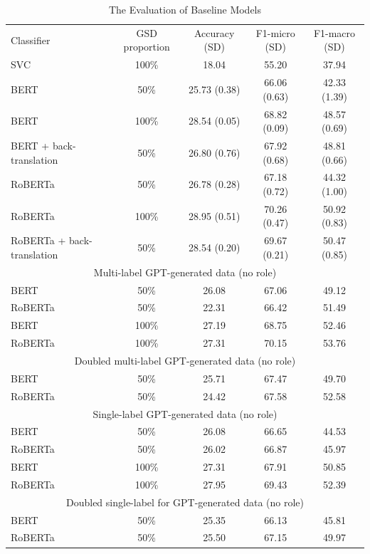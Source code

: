 \documentclass[manuscript]{clv3}
\begin{document}
\begin{table}
    \centering
    \begin{tabular}{lcccc}
          Classifier&GSD proportion&  Accuracy (SD)&  F1-micro (SD)&  F1-macro (SD)\\
         SVC&100\%&  18.04&  55.20&  37.94 \\
         BERT&50\%&  25.73 (0.38)&  66.06 (0.63)&  42.33 (1.39)\\
         BERT&100\%&  28.54 (0.05)&  68.82 (0.09)&  48.57 (0.69)\\
 BERT + back-translation&50\%& 26.80 (0.76)& 67.92 (0.68)& 48.81 (0.66)\\
 RoBERTa&50\%& 26.78 (0.28)& 67.18 (0.72)& 44.32 (1.00)\\
 RoBERTa&100\%& 28.95 (0.51)& 70.26 (0.47)& 50.92 (0.83)\\
 RoBERTa + back-translation&50\%& 28.54 (0.20)& 69.67 (0.21)& 50.47 (0.85)\\
 \multicolumn{5}{c}{Multi-label GPT-generated data (no role)}\\
 BERT&50\%& 26.08& 67.06& 49.12 \\
 RoBERTa&50\%& 22.31& 66.42& 51.49 \\
 BERT& 100\%& 27.19& 68.75& 52.46\\
 RoBERTa& 100\%& 27.31& 70.15& 53.76\\
 \multicolumn{5}{c}{Doubled multi-label GPT-generated data (no role)}\\
 BERT& 50\%& 25.71& 67.47&49.70\\
 RoBERTa& 50\%& 24.42& 67.58&52.58\\
 \multicolumn{5}{c}{Single-label GPT-generated data (no role)}\\
 BERT& 50\%& 26.08& 66.65&44.53\\
 RoBERTa& 50\%& 26.02& 66.87&45.97\\
 BERT& 100\%& 27.31& 67.91&50.85\\
 RoBERTa& 100\%& 27.95& 69.43&52.39\\
 \multicolumn{5}{c}{Doubled single-label for GPT-generated data (no role)}\\
 BERT& 50\%& 25.35& 66.13&45.81\\
 RoBERTa& 50\%& 25.50& 67.15&49.97\\
    \end{tabular}
    \caption{The Evaluation of Baseline Models}
    \label{tab:baseline_results}
\end{table}
\end{document}
